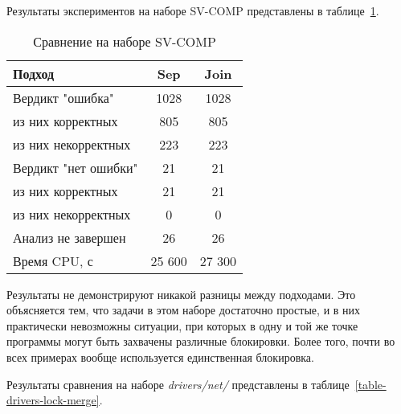 Результаты экспериментов на наборе SV-COMP представлены в таблице~\ref{table-svcomp-lock-merge}.

  \begin{table}[h]\footnotesize \centering
    \caption{Сравнение на наборе SV-COMP}
  	\label{table-svcomp-lock-merge}
    \begin{tabular}{ | l | c | c |}
      \hline
      Подход         				&  Sep		& Join 		\\ \hline
      Вердикт "ошибка" 				& 1028   	& 1028   	\\ 
  \hspace{0.5cm} из них корректных 	& 805 		& 805 	 	\\ 
  \hspace{0.5cm} из них некорректных & 223 		& 223 	   	\\ \hline
      Вердикт "нет ошибки"  		& 21    	& 21     	\\ 
  \hspace{0.5cm} из них корректных 	& 21 		& 21    	\\
  \hspace{0.5cm} из них некорректных & 0 		& 0    	  	\\ \hline
      Анализ не завершен       		& 26    	& 26      	\\ \hline
      Время CPU, с   				& 25 600 	& 27 300  	\\ 
      \hline
    \end{tabular}
  \end{table}

Результаты не демонстрируют никакой разницы между подходами.
Это объясняется тем, что задачи в этом наборе достаточно простые, и в них практически невозможны ситуации, при которых в одну и той же точке программы могут быть захвачены различные блокировки.
Более того, почти во всех примерах вообще используется единственная блокировка.

Результаты сравнения на наборе \textit{drivers/net/} представлены в таблице~\ref{table-drivers-lock-merge}.


